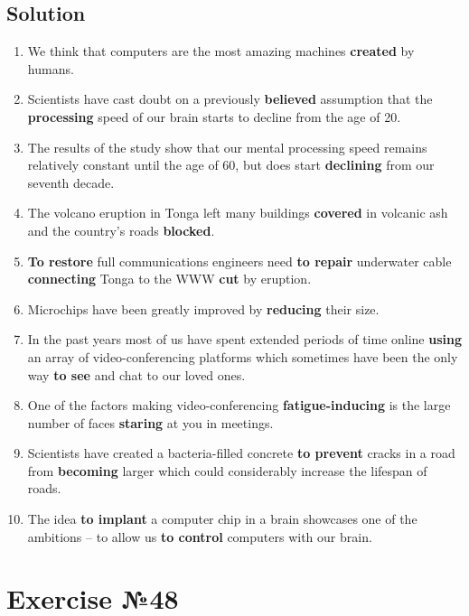\subsection*{Solution}
\begin{enumerate}
      \item We think that computers are the most amazing machines \textbf{created} by humans.
      \item Scientists have cast doubt on a previously \textbf{believed} assumption that the \textbf{processing} speed of our brain starts to decline from the age of 20.
      \item The results of the study show that our mental processing speed remains relatively constant until the age of 60, but does start \textbf{declining} from our seventh decade.
      \item The volcano eruption in Tonga left many buildings \textbf{covered} in volcanic ash and the country’s roads \textbf{blocked}.
      \item \textbf{To restore} full communications engineers need \textbf{to repair} underwater cable \textbf{connecting} Tonga to the WWW \textbf{cut} by eruption.
      \item Microchips have been greatly improved by \textbf{reducing} their size.
      \item In the past years most of us have spent extended periods of time online \textbf{using} an array of video-conferencing platforms which sometimes have been the only way \textbf{to see} and chat to our loved ones.
      \item One of the factors making video-conferencing \textbf{fatigue-inducing} is the large number of faces \textbf{staring} at you in meetings.
      \item Scientists have created a bacteria-filled concrete \textbf{to prevent} cracks in a road from \textbf{becoming} larger which could considerably increase the lifespan of roads.
      \item The idea \textbf{to implant} a computer chip in a brain showcases one of the ambitions – to allow us \textbf{to control} computers with our brain.
\end{enumerate}

\section{Exercise №48}
